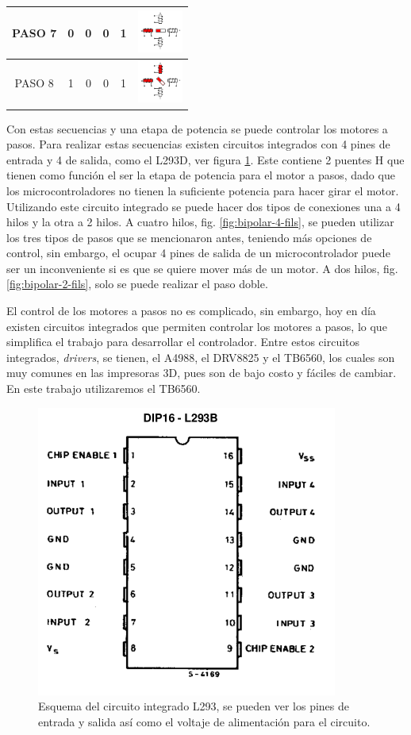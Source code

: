 \begin{table}
\begin{tabular}{|c|c|c|c|c|p{2cm}|}
		\hline 
		PASO 7 & 0 & 0 & 0 & 1 & \includegraphics[width=15mm]{Imagenes/2/paso4} \\ 
		\hline 
		PASO 8  & 1 & 0 & 0 & 1 & \includegraphics[width=15mm]{Imagenes/2/paso4_5} \\ 
		\hline 
	\end{tabular} 
\end{table}

Con estas secuencias y una etapa de potencia se puede controlar los motores a pasos. Para realizar estas secuencias existen circuitos integrados con 4 pines de entrada y 4 de salida, como el L293D, ver figura \ref{fig:l293}. Este contiene 2 puentes H que tienen como función el ser la etapa de potencia para el motor a pasos, dado que los microcontroladores no tienen la suficiente potencia para hacer girar el motor.
Utilizando este circuito integrado se puede hacer dos tipos de conexiones una a 4 hilos y la otra a 2 hilos. A cuatro hilos, fig. \ref{fig:bipolar-4-fils}, se pueden utilizar los tres tipos de pasos que se mencionaron antes, teniendo más opciones de control, sin embargo, el ocupar 4 pines de salida de un microcontrolador puede ser un inconveniente si es que se quiere mover más de un motor. A dos hilos, fig. \ref{fig:bipolar-2-fils}, solo se puede realizar el paso doble. %

El control de los motores a pasos no es complicado, sin embargo, hoy en día existen circuitos integrados que permiten controlar los motores a pasos, lo que simplifica el trabajo para desarrollar el controlador. Entre estos circuitos integrados, \textit{drivers}, se tienen, el A4988, el DRV8825 y el TB6560, los cuales son muy comunes en las impresoras 3D, pues son de bajo costo y fáciles de cambiar. En este trabajo utilizaremos el TB6560.
\begin{figure}[h]
	\centering
	\includegraphics[width=0.4\linewidth]{Imagenes/2/L293}
	\caption[Esquema del circuito integrado L293]{Esquema del circuito integrado L293, se pueden ver los pines de entrada y salida así como el voltaje de alimentación para el circuito. \cite{L2931986}}
	\label{fig:l293}
\end{figure}

